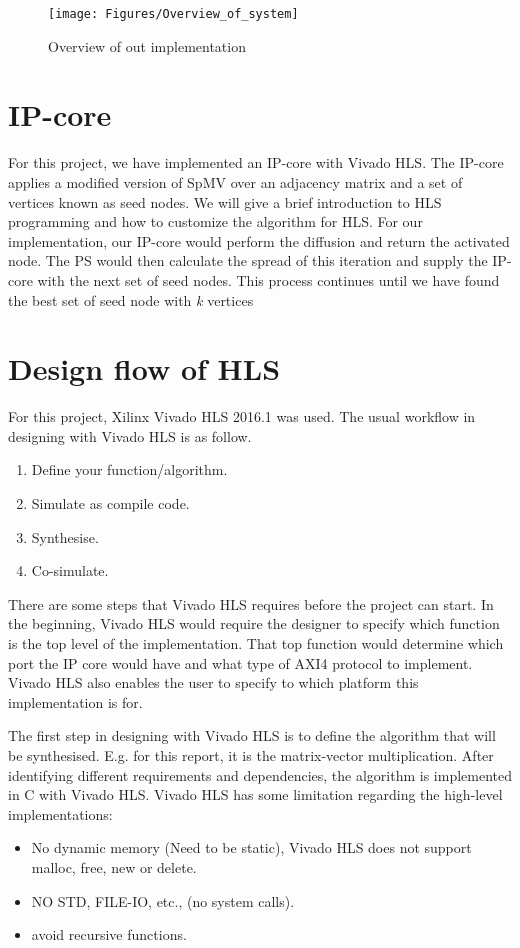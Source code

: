 \begin{figure}[!ht]
\centerline{\texttt{[image: Figures/Overview\_of\_system]}}
\caption{Overview of out implementation}
    \label{fig:overviewe}
\end{figure}


\section{IP-core}
For this project, we have implemented an IP-core with Vivado HLS. The IP-core applies a modified version of SpMV over an adjacency matrix and a set of vertices known as seed nodes. We will give a brief introduction to HLS programming and how to customize the algorithm for HLS. For our implementation, our IP-core would perform the diffusion and return the activated node. The PS would then calculate the spread of this iteration and supply the IP-core with the next set of seed nodes. This process continues until we have found the best set of seed node with \textit{k} vertices


\section{Design flow of HLS}

For this project, Xilinx Vivado HLS 2016.1 was used. The usual workflow in designing with Vivado HLS is as follow. 

\begin{enumerate}
\item Define your function/algorithm.
\item Simulate as compile code. 
\item Synthesise.
\item Co-simulate.
\end{enumerate}


There are some steps that Vivado HLS requires before the project can start. In the beginning, Vivado HLS would require the designer to specify which function is the top level of the implementation. That top function would determine which port the IP core would have and what type of AXI4 protocol to implement. Vivado HLS also enables the user to specify to which platform this implementation is for.


The first step in designing with Vivado HLS is to define the algorithm that will be synthesised. E.g. for this report, it is the matrix-vector multiplication. After identifying different requirements and dependencies, the algorithm is implemented in C with Vivado HLS. Vivado HLS has some limitation regarding the high-level implementations:
\begin{itemize}
\item No dynamic memory (Need to be static), Vivado HLS does not support malloc, free, new or delete. 
\item NO STD, FILE-IO, etc., (no system calls). 
\item avoid recursive functions. 
\end{itemize}



